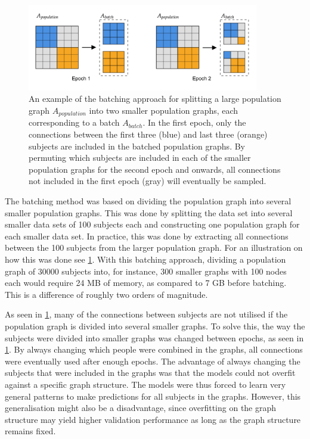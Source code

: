 \begin{figure}[!htbp]
    \centering
    \includegraphics[width=0.9\textwidth]{chapters/images_methods/batching.png}
    \caption{An example of the batching approach for splitting a large population graph $A_{population}$ into two smaller population graphs, each corresponding to a batch $A_{batch}$. In the first epoch, only the connections between the first three (blue) and last three (orange) subjects are included in the batched population graphs. By permuting which subjects are included in each of the smaller population graphs for the second epoch and onwards, all connections not included in the first epoch (gray) will eventually be sampled.}
    \label{fig:batches}
\end{figure}

The batching method was based on dividing the population graph into several smaller population graphs. This was done by splitting the data set into several smaller data sets of 100 subjects each and constructing one population graph for each smaller data set. In practice, this was done by extracting all connections between the 100 subjects from the larger population graph. For an illustration on how this was done see \cref{fig:batches}. With this batching approach, dividing a population graph of 30000 subjects into, for instance, 300 smaller graphs with 100 nodes each would require 24 MB of memory, as compared to 7 GB before batching. This is a difference of roughly two orders of magnitude.

As seen in \cref{fig:batches}, many of the connections between subjects are not utilised if the population graph is divided into several smaller graphs. To solve this, the way the subjects were divided into smaller graphs was changed between epochs, as seen in \cref{fig:batches}. By always changing which people were combined in the graphs, all connections were eventually used after enough epochs. The advantage of always changing the subjects that were included in the graphs was that the models could not overfit against a specific graph structure. The models were thus forced to learn very general patterns to make predictions for all subjects in the graphs. However, this generalisation might also be a disadvantage, since overfitting on the graph structure may yield higher validation performance as long as the graph structure remains fixed. 

